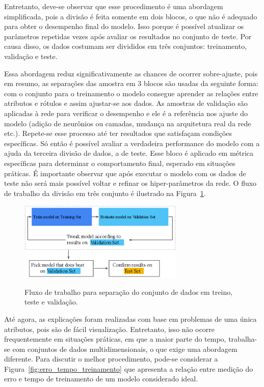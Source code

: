             Entretanto, deve-se observar que esse procedimento é uma abordagem simplificada, pois a divisão é feita somente em dois blocos, o que não é adequado para obter o desempenho final do modelo. Isso porque é possível atualizar os parâmetros repetidas vezes após avaliar os resultados no conjunto de teste. Por causa disso, os dados costumam ser divididos em três conjuntos: treinamento, validação e teste.
            
            Essa abordagem reduz significativamente as chances de ocorrer sobre-ajuste, pois em resumo, as separações das amostra em 3 blocos são usadas da seguinte forma: com o conjunto para o treinamento o modelo consegue aprender as relações entre atributos e rótulos e assim ajustar-se aos dados. As amostras de validação são aplicadas à rede para verificar o desempenho e ele é a referência nos ajuste do modelo (adição de neurônios ou camadas, mudança na arquitetura real da rede etc.). Repete-se esse processo até ter resultados que satisfaçam condições específicas. Só então é possível avaliar a verdadeira performance do modelo com a ajuda da terceira divisão de dados, a de teste. Esse bloco é aplicado em métrica específicas para determinar o comportamento final, esperado em situações práticas. É importante observar que após executar o modelo com os dados de teste não será mais possível voltar e refinar os hiper-parâmetros da rede. O fluxo de trabalho da divisão em três conjunto é ilustrado na Figura~\ref{fig:fluxo_treino_teste_validação}.
    
            \begin{figure}[H]
                \centering
                \caption{Fluxo de trabalho para separação do conjunto de dados em treino, teste e validação.}
                \includegraphics[width=0.7\textwidth]{fig/2-fundamentacao/overfitting/fluxo_treino_teste_validação.png}
                \label{fig:fluxo_treino_teste_validação}
            \end{figure}
            
            Até agora, as explicações foram realizadas com base em problemas de uma única atributos, pois são de fácil visualização. Entretanto, isso não ocorre frequentemente em situações práticas, em que a maior parte do tempo, trabalha-se com conjuntos de dados multidimensionais, o que exige uma abordagem diferente. Para discutir o melhor procedimento, pode-se considerar a Figura~\ref{fig:erro_tempo_treinamento} que apresenta a relação entre medição do erro e tempo de treinamento de um modelo considerado ideal.
            
